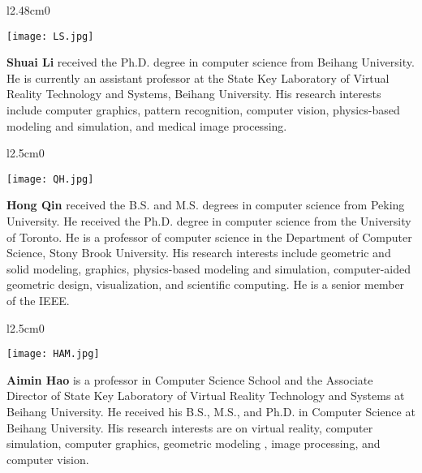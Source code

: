 \documentclass[journal]{IEEEtran}
\begin{document}
\begin{wrapfigure}[9]{l}{2.48cm}{0}
\vspace{-0.6cm}
\graphicspath{{author/}}
\texttt{[image: LS.jpg]}\\
\end{wrapfigure}
\vspace{0.2cm}
\textbf{Shuai Li} received the Ph.D. degree in computer science from Beihang University. He is currently an assistant professor at the State Key Laboratory of Virtual Reality Technology and Systems, Beihang University. His research interests include computer graphics, pattern recognition, computer vision, physics-based modeling and simulation, and medical image processing.\\

\begin{wrapfigure}[9]{l}{2.5cm}{0}
\vspace{-0.6cm}
\graphicspath{{author/}}
\texttt{[image: QH.jpg]}\\
\end{wrapfigure}
\vspace{0.2cm}
\textbf{Hong Qin} received the B.S. and M.S. degrees in computer science from Peking University. He received the Ph.D. degree in computer science from the University of Toronto. He is a professor of computer science in the Department of Computer Science, Stony Brook University. His research interests include geometric and solid modeling, graphics, physics-based modeling and simulation, computer-aided geometric design, visualization, and scientific computing. He is a senior member of the IEEE.\\

\begin{wrapfigure}[9]{l}{2.5cm}{0}
\vspace{-0.6cm}
\graphicspath{{author/}}
\texttt{[image: HAM.jpg]}\\
\end{wrapfigure}
\vspace{0.2cm}
\textbf{Aimin Hao} is a professor in Computer Science School and the Associate Director of State Key Laboratory of Virtual Reality Technology and Systems at Beihang University. He received his B.S., M.S., and Ph.D. in Computer Science at Beihang University. His research interests are on virtual reality, computer simulation, computer graphics, geometric modeling , image processing, and computer vision.\\

\fi
\end{document}
